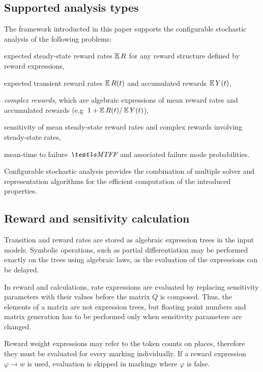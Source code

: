 \subsection{Supported analysis types}

The framework introducted in this paper supports the configurable stochastic analysis of the following problems:
\begin{itemize*}
\item expected steady-state reward rates $\operatorname{\mathbb{E}} R$ for any reward
  structure defined by reward expressions,
\item expected transient reward rates $\operatorname{\mathbb{E}} R(t)$ and accumulated
  rewards $\operatorname{\mathbb{E}} Y(t)$,
\item \emph{complex rewards}, which are algebraic expressions of mean
  reward rates and accumulated rewards
  (e.g~$1 + \operatorname{\mathbb{E}} R(t) / \operatorname{\mathbb{E}} Y(t)$),
\item sensitivity of mean steady-state reward rates and complex
  rewards involving steady-state rates,
\item mean-time to failure $\MTFF$ and associated failure mode
  probabilities.
\end{itemize*}
Configurable stochastic analysis provides the combination of multiple solver and representation algorithms for the efficient computation of the introduced properties.

\subsection{Reward and sensitivity calculation}

Transition and reward rates are stored as algebraic expression trees
in the input  models. Symbolic operations, such as partial
differentiation may be performed exactly on the trees using algebraic
laws, as the evaluation of the expressions can be delayed.

In reward and  calculations, rate expressions are
evaluated by replacing sensitivity parameters with their values before
the matrix $Q$ is composed. Thus, the elements of a matrix are not
expression trees, but floating point numbers and matrix generation
has to be performed only when sensitivity parameters are changed.

Reward weight expressions may refer to the token counts on places,
therefore they must be evaluated for every marking individually. If a
 reward expression $\varphi \rightarrow w$ is used,
evaluation is skipped in markings where $\varphi$ is false.

